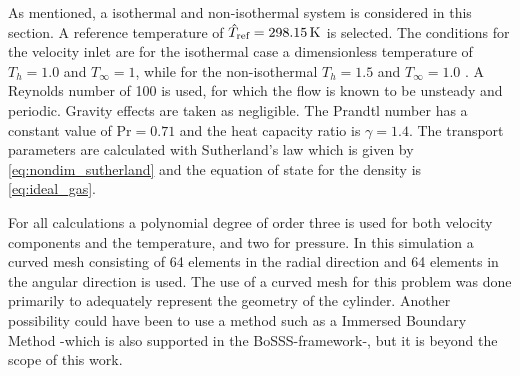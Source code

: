 As mentioned, a isothermal and non-isothermal system is considered in this section. A reference temperature of $\hat T_{\text{ref}} = \SI{298.15}{\kelvin}$ is selected. The conditions for the velocity inlet are for the isothermal case a dimensionless temperature of $T_h = 1.0$ and $T_\infty = 1$, while for the non-isothermal $T_h = 1.5$ and $T_\infty = 1.0$ . A Reynolds number of 100 is used, for which the flow is known to be unsteady and periodic. Gravity effects are taken as negligible. The Prandtl number has a constant value of $\text{Pr} = 0.71$ and the heat capacity ratio is $\gamma = 1.4$. The transport parameters are calculated with Sutherland's law which is given by \cref{eq:nondim_sutherland} and the equation of state for the density is \cref{eq:ideal_gas}.

For all calculations a polynomial degree of order three is used for both velocity components and the temperature, and two for pressure. In this simulation a curved mesh consisting of 64 elements in the radial direction and 64 elements in the angular direction is used. The use of a curved mesh for this problem was done primarily to adequately represent the geometry of the cylinder. Another possibility could have been to use a method such as a Immersed Boundary Method -which is also supported in the BoSSS-framework-, but it is beyond the scope of this work.

